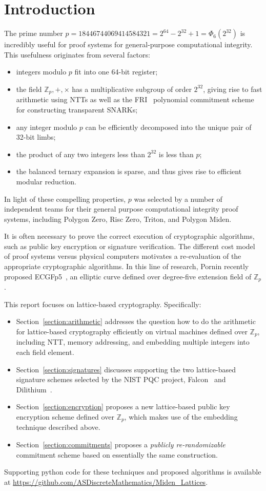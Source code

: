 \section{Introduction}

The prime number $p = 18446744069414584321 = 2^{64} - 2^{32} + 1 = \Phi_6(2^{32})$ is incredibly useful for proof systems for general-purpose computational integrity. This usefulness originates from several factors:
\begin{itemize}
 \item integers modulo $p$ fit into one 64-bit register;
 \item the field $\mathbb{Z}_p, +, \times$ has a multiplicative subgroup of order $2^{32}$, giving rise to fast arithmetic using NTTs as well as the FRI~\cite{fri} polynomial commitment scheme for constructing transparent SNARKs;
 \item any integer modulo $p$ can be efficiently decomposed into the unique pair of 32-bit limbs;
 \item the product of any two integers less than $2^{32}$ is less than $p$;
 \item the balanced ternary expansion is sparse, and thus gives rise to efficient modular reduction.
\end{itemize}
In light of these compelling properties, $p$ was selected by a number of independent teams for their general purpose computational integrity proof systems, including Polygon Zero, Risc Zero, Triton, and Polygon Miden.

It is often necessary to prove the correct execution of cryptographic algorithms, such as public key encryption or signature verification. The different cost model of proof systems versus physical computers motivates a re-evaluation of the appropriate cryptographic algorithms. In this line of research, Pornin recently proposed ECGFp5~\cite{ecgfp5}, an elliptic curve defined over degree-five extension field of $\mathbb{Z}_p$.

This report focuses on lattice-based cryptography. Specifically:
\begin{itemize}
\item Section~\ref{section:arithmetic} addresses the question how to do the arithmetic for lattice-based cryptography efficiently on virtual machines defined over $\mathbb{Z}_p$, including NTT, memory addressing, and embedding multiple integers into each field element.
\item Section~\ref{section:signatures} discusses supporting the two lattice-based signature schemes selected by the NIST PQC project, Falcon~\cite{falcon} and Dilithium~\cite{dilithium}.
\item Section~\ref{section:encryption} proposes a new lattice-based public key encryption scheme defined over $\mathbb{Z}_p$, which makes use of the embedding technique described above.
\item Section~\ref{section:commitments} proposes a \emph{publicly re-randomizable} commitment scheme based on essentially the same construction.
\end{itemize}
Supporting python code for these techniques and proposed algorithms is available at \url{https://github.com/ASDiscreteMathematics/Miden_Lattices}.